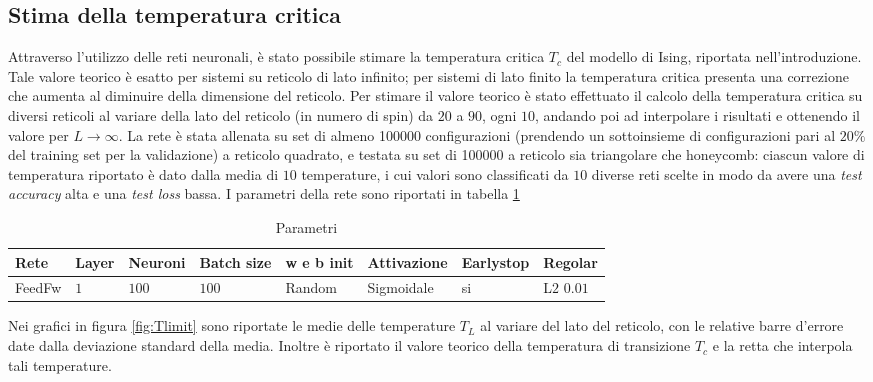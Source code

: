 \documentclass{article}
\begin{document}
\subsection{Stima della temperatura critica}
Attraverso l'utilizzo delle reti neuronali, è stato possibile stimare la temperatura critica $T_c$ del modello di Ising, riportata nell'introduzione. Tale valore teorico è esatto per sistemi su reticolo di lato infinito; per sistemi di lato finito la temperatura critica presenta una correzione che aumenta al diminuire della dimensione del reticolo. Per stimare il valore teorico è stato effettuato il calcolo della temperatura critica su diversi reticoli al variare della lato del reticolo (in numero di spin) da $20$ a $90$, ogni $10$, andando poi ad interpolare i risultati e ottenendo il valore per $L\rightarrow \infty$.
La rete è stata allenata su set di almeno \num{100000} configurazioni (prendendo un sottoinsieme di configurazioni pari al $20\%$ del training set per la validazione) a reticolo quadrato, e testata su set di \num{100000} a reticolo sia triangolare che honeycomb: ciascun valore di temperatura riportato è dato dalla media di $10$ temperature, i cui valori sono classificati da $10$ diverse reti scelte in modo da avere una \emph{test accuracy} alta e una \emph{test loss} bassa. I parametri della rete sono riportati in tabella \ref{tab:ffnnpar}
\begin{table}[ht]
\begin{center}
\begin{tabular}{llllllll}
\toprule
Rete & Layer & Neuroni & Batch size & w e b init & Attivazione & Earlystop & Regolar\\
\midrule
FeedFw & $1$ & $100$ & $100$ & Random & Sigmoidale & si & L$2$ $0.01$\\
\bottomrule
\end{tabular}
\end{center}
\caption{Parametri}
\label{tab:ffnnpar}
\end{table}
Nei grafici in figura \ref{fig:Tlimit} sono riportate le medie delle temperature $T_L$ al variare del lato del reticolo, con le relative barre d'errore date dalla deviazione standard della media. Inoltre è riportato il valore teorico della temperatura di transizione $T_c$ e la retta che interpola tali temperature.
\end{document}
